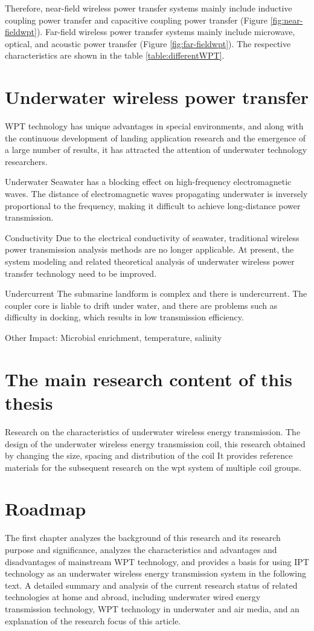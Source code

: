 Therefore, near-field wireless power transfer systems mainly include inductive coupling power transfer and capacitive coupling power transfer (Figure \ref{fig:near-fieldwpt}). Far-field wireless power transfer systems mainly include microwave, optical, and acoustic power transfer (Figure \ref{fig:far-fieldwpt}).  The respective characteristics are shown in the table \ref{table:differentWPT}.


\section{Underwater wireless power transfer}
WPT technology has unique advantages in special environments, and along with the continuous development of landing application research and the emergence of a large number of results, it has attracted the attention of underwater technology researchers. 

Underwater
Seawater has a blocking effect on high-frequency electromagnetic waves. The distance of electromagnetic waves propagating underwater is inversely proportional to the frequency, making it difficult to achieve long-distance power transmission.

Conductivity
Due to the electrical conductivity of seawater, traditional wireless power transmission analysis methods are no longer applicable. At present, the system modeling and related theoretical analysis of underwater wireless power transfer technology need to be improved.

Undercurrent
The submarine landform is complex and there is undercurrent. The coupler core is liable to drift under water, and there are problems such as difficulty in docking, which results in low transmission efficiency.

Other Impact:
Microbial enrichment, temperature, salinity


\section{The main research content of this thesis}
Research on the characteristics of underwater wireless energy transmission.
The design of the underwater wireless energy transmission coil, this research obtained by changing the size, spacing and distribution of the coil
It provides reference materials for the subsequent research on the wpt system of multiple coil groups.

\section{Roadmap}
The first chapter analyzes the background of this research and its research purpose and significance, analyzes the characteristics and advantages and disadvantages of mainstream WPT technology, and provides a basis for using IPT technology as an underwater wireless energy transmission system in the following text. A detailed summary and analysis of the current research status of related technologies at home and abroad, including underwater wired energy transmission technology, WPT technology in underwater and air media, and an explanation of the research focus of this article.

